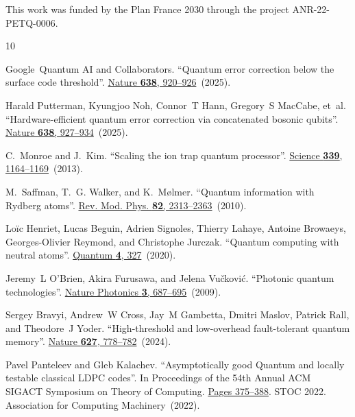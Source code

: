 \documentclass[a4paper,onecolumn,11pt]{quantumarticle}
\begin{document}
\begin{acknowledgements}
This work was funded by the Plan France 2030 through the project ANR-22-PETQ-0006.
\end{acknowledgements}

%
%

\begin{thebibliography}{10}

Google~Quantum AI and Collaborators.
\newblock ``Quantum error correction below the surface code threshold''.
\newblock \href{https://dx.doi.org/10.1038/s41586-024-08449-y}{Nature {\bf
  638}, 920--926}~(2025).

Harald Putterman, Kyungjoo Noh, Connor~T Hann, Gregory~S MacCabe, et~al.
\newblock ``Hardware-efficient quantum error correction via concatenated
  bosonic qubits''.
\newblock \href{https://dx.doi.org/10.1038/s41586-025-08642-7}{Nature {\bf
  638}, 927--934}~(2025).

C.~Monroe and J.~Kim.
\newblock ``Scaling the ion trap quantum processor''.
\newblock \href{https://dx.doi.org/10.1126/science.1231298}{Science {\bf 339},
  1164--1169}~(2013).

M.~Saffman, T.~G. Walker, and K.~M\o{}lmer.
\newblock ``{Quantum information with Rydberg atoms}''.
\newblock \href{https://dx.doi.org/10.1103/RevModPhys.82.2313}{Rev. Mod. Phys.
  {\bf 82}, 2313--2363}~(2010).

Lo{\"{i}}c Henriet, Lucas Beguin, Adrien Signoles, Thierry Lahaye, Antoine
  Browaeys, Georges-Olivier Reymond, and Christophe Jurczak.
\newblock ``Quantum computing with neutral atoms''.
\newblock \href{https://dx.doi.org/10.22331/q-2020-09-21-327}{{Quantum} {\bf
  4}, 327}~(2020).

Jeremy~L O'Brien, Akira Furusawa, and Jelena Vu{\v{c}}kovi{\'c}.
\newblock ``Photonic quantum technologies''.
\newblock \href{https://dx.doi.org/10.1038/nphoton.2009.229}{Nature Photonics
  {\bf 3}, 687--695}~(2009).

Sergey Bravyi, Andrew~W Cross, Jay~M Gambetta, Dmitri Maslov, Patrick Rall, and
  Theodore~J Yoder.
\newblock ``High-threshold and low-overhead fault-tolerant quantum memory''.
\newblock \href{https://dx.doi.org/10.1038/s41586-024-07107-7}{Nature {\bf
  627}, 778--782}~(2024).

Pavel Panteleev and Gleb Kalachev.
\newblock ``{Asymptotically good Quantum and locally testable classical LDPC
  codes}''.
\newblock In Proceedings of the 54th Annual ACM SIGACT Symposium on Theory of
  Computing.
\newblock \href{https://dx.doi.org/10.1145/3519935.3520017}{Pages 375–388}.
\newblock STOC 2022. Association for Computing Machinery~(2022).


\end{thebibliography}
\end{document}
